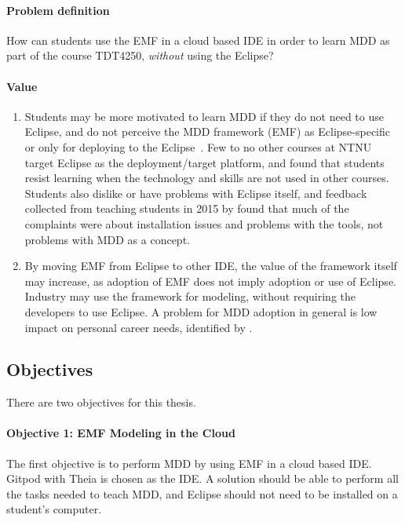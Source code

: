 \paragraph{Problem definition}
How can students use the \acrfull{EMF} in a \gls{cloud} based \acrfull{IDE} in order to learn \acrfull{MDD} as part of the course \gls{TDT4250}, \textit{without} using the \gls{Eclipse}?

\paragraph{Value}
\begin{enumerate}
  \item Students may be more motivated to learn \acrshort{MDD} if they do not need to use \gls{Eclipse}, and do not perceive the \acrshort{MDD} framework (\acrshort{EMF}) as \gls{Eclipse}-specific or only for deploying to the \gls{Eclipse}~\cite[p.~2]{rekstadModelingEnvironmentCloud2020}.
  Few to no other courses at \acrshort{NTNU} target \gls{Eclipse} as the deployment/target platform, and \textcite{kuzniarzTeachingModelDrivenSoftware2016} found that students resist learning when the technology and skills are not used in other courses.
  Students also dislike or have problems with \gls{Eclipse} itself, and feedback collected from teaching students in 2015 by \textcite{jordicabotFailedConvinceMy2015} found that much of the complaints were about installation issues and problems with the tools, not problems with \acrshort{MDD} as a concept.
  
  \item By moving \acrshort{EMF} from \gls{Eclipse} to other \gls{IDE}, the value of the framework itself may increase, as adoption of \acrshort{EMF} does not imply adoption or use of \gls{Eclipse}.
  Industry may use the framework for modeling, without requiring the developers to use \gls{Eclipse}.
  A problem for \acrshort{MDD} adoption in general is low impact on personal career needs, identified by \textcite{jonwhittleTaxonomyToolrelatedIssues2015}.
\end{enumerate}
  

\subsection{Objectives}

There are two objectives for this thesis.

\paragraph{Objective 1: EMF Modeling in the Cloud}
The first objective is to perform \acrfull{MDD} by using \acrfull{EMF} in a cloud based \acrshort{IDE}.
\Gls{Gitpod} with \gls{Theia} is chosen as the \acrshort{IDE}.
A solution should be able to perform all the tasks needed to teach \acrshort{MDD}, and \gls{Eclipse} should not need to be installed on a student's computer.

